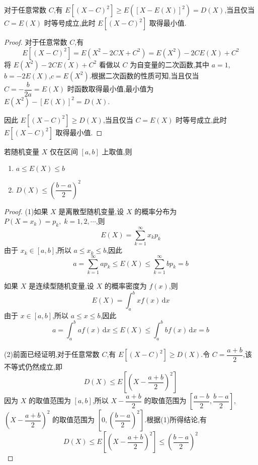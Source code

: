 \begin{conclusion}
    \indent 对于任意常数 $C$,有 $E[(X-C)^2] \geqslant E([X-E(X)]^2) = D(X)$,当且仅当 $C=E(X)$ 时等号成立,此时 $E[(X-C)^2]$ 取得最小值.
\end{conclusion}

\begin{proof}
    对于任意常数 $C$,有
    $$
    E[(X-C)^2] = E(X^2 - 2CX + C^2) = E(X^2) - 2CE(X) + C^2
    $$
    将 $E(X^2) - 2CE(X) + C^2$ 看做以 $C$ 为自变量的二次函数,其中 $a=1$,$b=-2E(X)$,$c=E(X^2)$.根据二次函数的性质可知,当且仅当 $C=-\dfrac{b}{2a}=E(X)$ 时函数取得最小值,最小值为 $E(X^2) - [E(X)]^2 = D(X)$.
    
    因此 $E[(X-C)^2] \geqslant D(X)$,当且仅当 $C=E(X)$ 时等号成立,此时 $E[(X-C)^2]$ 取得最小值.
\end{proof}

\begin{conclusion}
    \indent 若随机变量 $X$ 仅在区间 $[a,b]$ 上取值,则
    \begin{enumerate}
        \item $a \leqslant E(X) \leqslant b$
        \item $D(X) \leqslant \left( \dfrac{b-a}{2} \right)^2$
    \end{enumerate}
\end{conclusion}

\begin{proof}
    (1)如果 $X$ 是离散型随机变量,设 $X$ 的概率分布为 $P(X = x_k) = p_k, \; k=1,2,\cdots$,则
    $$
    E(X) = \sum_{k=1}^{\infty} x_k p_k
    $$
    由于 $x_k \in [a,b]$,所以 $a \leqslant x_k \leqslant b$,因此
    $$
    a = \sum_{k=1}^{\infty} a p_k \leqslant E(X) \leqslant \sum_{k=1}^{\infty} b p_k = b
    $$

    如果 $X$ 是连续型随机变量,设 $X$ 的概率密度为 $f(x)$,则
    $$
    E(X) = \int_{a}^{b} x f(x)\,\text{d}x
    $$
    由于 $x \in [a,b]$,所以 $a \leqslant x \leqslant b$,因此
    $$
    a = \int_{a}^{b} a f(x)\,\text{d}x \leqslant E(X) \leqslant \int_{a}^{b} b f(x)\,\text{d}x = b
    $$

    (2)前面已经证明,对于任意常数 $C$,有 $E[(X-C)^2] \geqslant D(X)$.令 $C = \dfrac{a+b}{2}$,该不等式仍然成立,即
    $$
    D(X) \leqslant E[(X - \dfrac{a+b}{2})^2 ]
    $$
    因为 $X$ 的取值范围为 $[a,b]$,所以 $X - \dfrac{a+b}{2}$ 的取值范围为 $\left[ \dfrac{a-b}{2}, \dfrac{b-a}{2} \right]$,$\left( X - \dfrac{a+b}{2} \right)^2$ 的取值范围为 $\left[ 0, \left( \dfrac{b-a}{2} \right)^2 \right]$.根据(1)所得结论,有
    $$
    D(X) \leqslant E[(X - \dfrac{a+b}{2})^2] \leqslant \left( \dfrac{b-a}{2} \right)^2
    $$
\end{proof}

